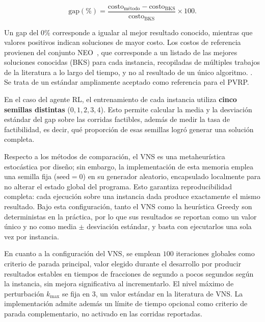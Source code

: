 \begin{equation}
    \text{gap}(\%) = \frac{\text{costo}_{\text{método}} - \text{costo}_{\text{BKS}}}{\text{costo}_{\text{BKS}}} \times 100.
    \label{eq:gap}
\end{equation}

Un gap del $0\%$ corresponde a igualar al mejor resultado conocido, mientras que valores positivos indican soluciones de mayor costo. Los costos de referencia provienen del conjunto NEO~\cite{NEO2013}, que corresponde a un listado de las mejores soluciones conocidas (BKS) para cada instancia, recopiladas de múltiples trabajos de la literatura a lo largo del tiempo, y no al resultado de un único algoritmo. .  Se trata de un estándar ampliamente aceptado como referencia para el PVRP.

En el caso del agente RL, el entrenamiento de cada instancia utiliza \textbf{cinco semillas distintas} ($0, 1, 2, 3, 4$). Esto permite calcular la media y la desviación estándar del gap sobre las corridas factibles, además de medir la tasa de factibilidad, es decir, qué proporción de esas semillas logró generar una solución completa.

Respecto a los métodos de comparación, el VNS es una metaheurística estocástica por diseño; sin embargo, la implementación de esta memoria emplea una semilla fija ($\text{seed}=0$) en su generador aleatorio, encapsulado localmente para no alterar el estado global del programa. Esto garantiza reproducibilidad completa: cada ejecución sobre una instancia dada produce exactamente el mismo resultado. Bajo esta configuración, tanto el VNS como la heurística Greedy son deterministas en la práctica, por lo que sus resultados se reportan como un valor único y no como media $\pm$ desviación estándar, y basta con ejecutarlos una sola vez por instancia.

En cuanto a la configuración del VNS, se emplean $100$ iteraciones globales como criterio de parada principal, valor elegido durante el desarrollo por producir resultados estables en tiempos de fracciones de segundo a pocos segundos según la instancia, sin mejora significativa al incrementarlo. El nivel máximo de perturbación $k_{\max}$ se fija en $3$, un valor estándar en la literatura de VNS.  La implementación admite además un límite de tiempo opcional como criterio de parada complementario, no activado en las corridas reportadas.

